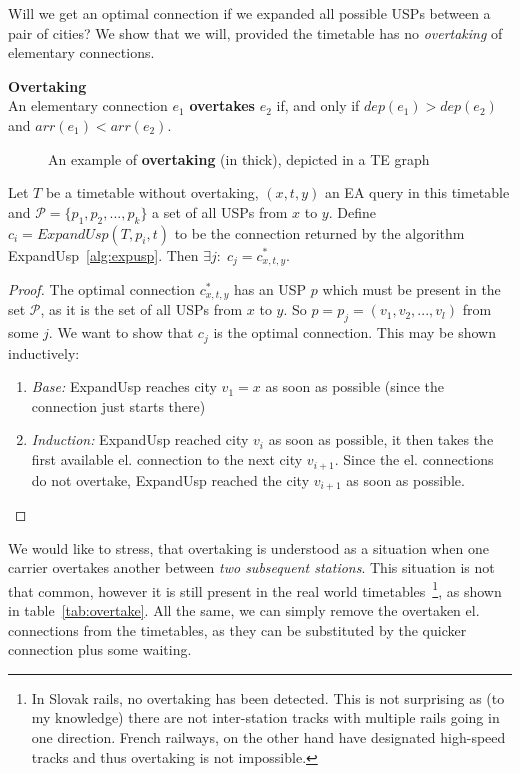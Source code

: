 	\noindent Will we get an optimal connection if we expanded all possible USPs between a pair of cities? We show that we will, provided the timetable has no \textit{overtaking} of elementary connections.
	
	\begin{definition}
        \textbf{Overtaking} \\
		An elementary connection $e_{1}$ \textbf{overtakes} $e_{2}$ if, and only if $dep(e_{1}) > dep(e_{2})$ and $arr(e_{1}) < arr(e_{2})$. 
    \end{definition}
    
    \begin{figure}[h!]
		\begin{center}
		\end{center}
		\caption{\label{fig:overtake} An example of \textcolor{green!80!black}{\textbf{overtaking}} (in thick), depicted in a TE graph}
	\end{figure}
    
    \begin{lemma}
    	Let $T$ be a timetable without overtaking, $(x, t, y)$ an EA query in this timetable and $\mathcal{P} = \{p_{1}, p_{2}, ..., p_{k}\}$ a set of all USPs from $x$ to $y$. Define $c_{i} = ExpandUsp(T, p_{i}, t)$ to be the connection returned by the algorithm ExpandUsp~\ref{alg:expusp}. Then $\exists j:\; c_{j} = c_{x, t, y}^{*}$.
    \end{lemma}
    \begin{proof}
    	The optimal connection $c_{x, t, y}^{*}$ has an USP $p$ which must be present in the set $\mathcal{P}$, as it is the set of all USPs from $x$ to $y$. So $p = p_{j} = (v_{1}, v_{2},..., v_{l})$ from some $j$. We want to show that $c_{j}$ is the optimal connection. This may be shown inductively:
    	\begin{enumerate}
    		\item \textit{Base:} ExpandUsp reaches city $v_{1} = x$ as soon as possible (since the connection just starts there)
    		\item \textit{Induction:} ExpandUsp reached city $v_{i}$ as soon as possible, it then takes the first available el. connection to the next city $v_{i + 1}$. Since the el. connections do not overtake, ExpandUsp reached the city $v_{i + 1}$ as soon as possible.
    	\end{enumerate}
    \end{proof}
    
    \noindent We would like to stress, that overtaking is understood as a situation when one carrier overtakes another between \textit{two subsequent stations}. This situation is not that common, however it is still present in the real world timetables~\footnote{In Slovak rails, no overtaking has been detected. This is not surprising as (to my knowledge) there are not inter-station tracks with multiple rails going in one direction. French railways, on the other hand have designated high-speed tracks and thus overtaking is not impossible.}, as shown in table~\ref{tab:overtake}. All the same, we can simply remove the overtaken el. connections from the timetables, as they can be substituted by the quicker connection plus some waiting. \\
    
